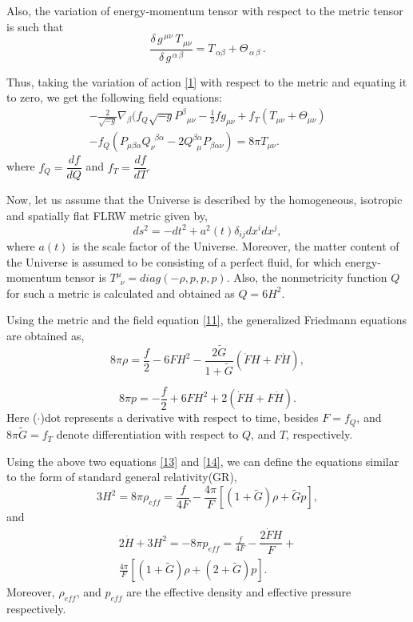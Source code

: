 Also, the variation of energy-momentum tensor with respect to the metric tensor is such that
\begin{equation}  \label{10}
\frac{\delta\,g^{\,\mu\nu}\,T_{\,\mu\nu}}{\delta\,g^{\,\alpha\,\beta}}= T_{\,\alpha\beta}+\Theta_{\,\alpha\,\beta}\,.
\end{equation}

Thus, taking the variation of action \eqref{1} with respect to the metric and equating it to zero, we get the following field equations:
\begin{multline}  \label{11}
-\frac{2}{\sqrt{-g}}\nabla_{\beta}(f_{Q}\sqrt{-g} P^{\beta}_{\,\,\,\, \mu \nu}-\frac{1}{2}f g_{\mu \nu}+ f_{T}(T_{\mu \nu}+\Theta_{\mu \nu})\\
-f_{Q}(P_{\mu \beta \alpha}Q_{\nu}^{\,\,\, \beta \alpha}-2Q^{\beta \alpha}_{\, \, \, \mu}P_{\beta \alpha\nu})= 8\pi T_{\mu \nu}.
\end{multline}
where $f_{Q}= \dfrac{df}{dQ}$ and $f_{T}= \dfrac{df}{dT}$.

Now, let us assume that the Universe is described by the homogeneous, isotropic and spatially flat FLRW metric given by, 
\begin{equation}  \label{12}
ds^{2}= -dt^{2}+ a^{2}(t)\delta_{ij}dx^{i}dx^{j},
\end{equation}
where $a(t)$ is the scale factor of the Universe. Moreover, the matter content of the Universe is assumed to be consisting of a perfect fluid, for which energy-momentum tensor is $T^{\mu}_{\,\,\, \nu} = diag(-\rho, p, p, p)$. Also, the nonmetricity function $Q$ for such a metric is calculated and obtained as $Q=6H^{2}$. 


Using the metric and the field equation \eqref{11}, the generalized Friedmann equations are obtained as,
\begin{equation} \label{13}
8 \pi \rho= \frac{f}{2} -6 F H^{2}- \frac{2 \widetilde{G}}{1+\widetilde{G}}(\dot{F} H+ F\dot{H}),
\end{equation}

\begin{equation}\label{14}
8 \pi p= -\frac{f}{2} + 6 F H^{2} + 2(\dot{F}H+F \dot{H}).
\end{equation}
Here ($\cdot$)dot represents a derivative with respect to time, besides $F= f_{Q}$, and $8 \pi \widetilde{G}=f_{T}$ denote differentiation with respect to $Q$, and $T$, respectively.

Using the above two equations \eqref{13} and \eqref{14}, we can define the equations similar to the form of standard general relativity(GR),
\begin{equation}  
\label{15}
3H^2=8\pi \rho_{eff}= \frac{f}{4F}-\frac{4\pi}{F} \left[(1+ \widetilde{G})\rho+\widetilde{G} p\right],
\end{equation}
and 
\begin{multline}  \label{16}
2\dot{H}+ 3H^2=-8 \pi p_{eff}= \frac{f}{4F}-\dfrac{2\dot{F}H}{F}+\\
\frac{4\pi}{F} \left[(1+ \widetilde{G})\rho+(2+\widetilde{G}) p\right].
\end{multline} 
Moreover, $\rho_{eff}$, and $p_{eff}$ are the effective density and effective pressure respectively.

